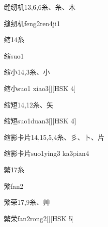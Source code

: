 \begin{entry}{缝纫机}{13,6,6}{⽷、⽷、⽊}
  \begin{phonetics}{缝纫机}{feng2ren4ji1}
  \end{phonetics}
\end{entry}

\begin{entry}{缩}{14}{⽷}
  \begin{phonetics}{缩}{suo1}
  \end{phonetics}
\end{entry}

\begin{entry}{缩小}{14,3}{⽷、⼩}
  \begin{phonetics}{缩小}{suo1 xiao3}[][HSK 4]
  \end{phonetics}
\end{entry}

\begin{entry}{缩短}{14,12}{⽷、⽮}
  \begin{phonetics}{缩短}{suo1duan3}[][HSK 4]
  \end{phonetics}
\end{entry}

\begin{entry}{缩影卡片}{14,15,5,4}{⽷、⼺、⼘、⽚}
  \begin{phonetics}{缩影卡片}{suo1ying3 ka3pian4}
  \end{phonetics}
\end{entry}

\begin{entry}{繁}{17}{⽷}
  \begin{phonetics}{繁}{fan2}
  \end{phonetics}
\end{entry}

\begin{entry}{繁荣}{17,9}{⽷、⾋}
  \begin{phonetics}{繁荣}{fan2rong2}[][HSK 5]
  \end{phonetics}
\end{entry}



